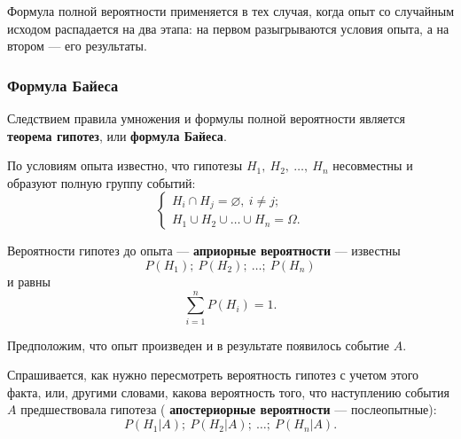 \documentclass[a4paper]{article}
\newcommand{\none}{\varnothing}
\newcommand{\key}[1]{{\bfseries\color{Medium} #1}}
\begin{document}
                Формула полной вероятности применяется в тех случая, когда опыт со случайным исходом распадается на два этапа: на первом разыгрываются условия опыта, а на втором --- его результаты.

            \subsubsection{Формула Байеса}
                
                Следствием правила умножения и формулы полной вероятности является \key{теорема гипотез}, или \key{формула Байеса}.

                По условиям опыта известно, что гипотезы $H_1 , \: H_2 , \: \ldots , \: H_n$ несовместны и образуют полную группу событий:
                \begin{equation*}
                    \begin{cases}
                        H_i \cap H_j = \none, \: i \neq j ; \\[1.0ex]
                        H_1 \cup H_2 \cup \ldots \cup H_n = \Omega .
                    \end{cases}
                \end{equation*}

                Вероятности гипотез до опыта --- \key{априорные вероятности} --- известны
                \begin{equation*}
                    P(H_1) ; \: P(H_2) ; \: \ldots ; \: P(H_n)
                \end{equation*}
                и равны
                \begin{equation*}
                    \sum\limits_{i = 1}^{n} P(H_i) = 1 .
                \end{equation*}

                Предположим, что опыт произведен и в результате появилось событие $A$.
                
                Спрашивается, как нужно пересмотреть вероятность гипотез с учетом этого факта, или, другими словами, какова вероятность того, что наступлению события $A$ предшествовала гипотеза (\key{апостериорные вероятности} --- послеопытные):
                \begin{equation*}
                    P(H_1 | A) ; \: P(H_2 | A) ; \: \ldots ; \: P(H_n | A) .
                \end{equation*}
\end{document}

